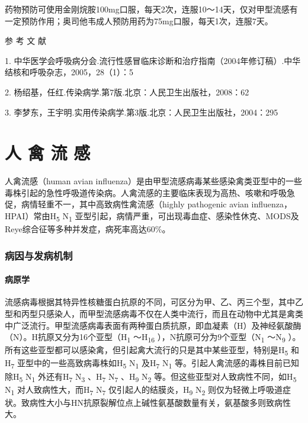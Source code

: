 药物预防可使用金刚烷胺100mg口服，每天2次，连服10～14天，仅对甲型流感有一定预防作用；奥司他韦成人预防用药为75mg口服，每天1次，连服7天。

\protect\hypertarget{text00212.html}{}{}

\hypertarget{text00212.htmlux5cux23CHP7-1-5}{}
参 考 文 献

1.
中华医学会呼吸病分会.流行性感冒临床诊断和治疗指南（2004年修订稿）.中华结核和呼吸杂志，2005，28（1）：5

2. 杨绍基，任红.传染病学.第7版.北京：人民卫生出版社，2008：62

3. 李梦东，王宇明.实用传染病学.第3版.北京：人民卫生出版社，2004：295

\protect\hypertarget{text00213.html}{}{}

\chapter{人 禽 流 感}

人禽流感（human avian
influenza）是由甲型流感病毒某些感染禽类亚型中的一些毒株引起的急性呼吸道传染病。人禽流感的主要临床表现为高热、咳嗽和呼吸急促，病情轻重不一，其中高致病性禽流感（highly
pathogenic avian influenza，HPAI）常由H\textsubscript{5}
N\textsubscript{1}
亚型引起，病情严重，可出现毒血症、感染性休克、MODS及Reye综合征等多种并发症，病死率高达60\%。

\subsection{病因与发病机制}

\subsubsection{病原学}

流感病毒根据其特异性核糖蛋白抗原的不同，可区分为甲、乙、丙三个型，其中乙型和丙型只感染人，而甲型流感病毒不仅在人类中流行，而且在动物中尤其是禽类中广泛流行。甲型流感病毒表面有两种蛋白质抗原，即血凝素（H）及神经氨酸酶（N）。H抗原又分为16个亚型（H\textsubscript{1}
～H\textsubscript{16} ），N抗原可分为9个亚型（N\textsubscript{1}
～N\textsubscript{9}
）。所有这些亚型都可以感染禽，但引起禽大流行的只是其中某些亚型，特别是H\textsubscript{5}
和H\textsubscript{7} 亚型中的一些高致病毒株如H\textsubscript{5}
N\textsubscript{1} 及H\textsubscript{7} N\textsubscript{1}
等。引起人禽流感的毒株目前已知除H\textsubscript{5} N\textsubscript{1}
外还有H\textsubscript{7} N\textsubscript{3} 、H\textsubscript{7}
N\textsubscript{7} 、H\textsubscript{9} N\textsubscript{2}
等。但这些亚型对人致病性不同，如H\textsubscript{5} N\textsubscript{1}
对人致病性大，而H\textsubscript{7} N\textsubscript{7}
仅引起人的结膜炎，H\textsubscript{9} N\textsubscript{2}
则仅为轻微上呼吸道症状。致病性大小与HN抗原裂解位点上碱性氨基酸数量有关，氨基酸多则致病性大。

